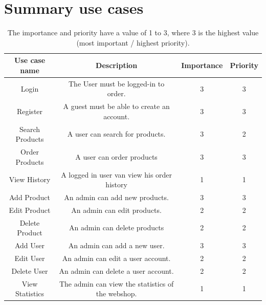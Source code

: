 \documentclass[titlepage, a4paper, 12pt]{article}
\begin{document}
\section{Summary use cases}
\begin{table}[ht]
	\centering
	\captionsetup{labelformat=empty}
	\begin{tabular}{|c|c|c|c|}
		\hline
		Use case name & Description & Importance & Priority\\
		\hline\hline
		Login & The User must be logged-in to order. & 3 & 3\\
		\hline
		Register & A guest must be able to create an account. & 3 & 3\\
		\hline
		Search Products & A user can search for products. & 3 & 2\\
		\hline
		Order Products & A user can order products & 3 & 3\\
		\hline
		View History & A logged in user van view his order history & 1 & 1\\
		\hline
		Add Product & An admin can add new products. & 3 & 3\\
		\hline
		Edit Product & An admin can edit products. & 2 & 2\\
		\hline
		Delete Product & An admin can delete products & 2 & 2\\
		\hline
		Add User & An admin can add a new user. & 3 & 3\\
		\hline
		Edit User & An admin can edit a user account. & 2 & 2\\
		\hline
		Delete User & An admin can delete a user account. & 2 & 2\\
		\hline
		View Statistics & The admin can view the statistics of the webshop. & 1 & 1\\
	\hline\end{tabular}
	\caption{The importance and priority have a value of 1 to 3, where 3 is the highest value (most important / highest priority).}
\end{table}

\newpage
\end{document}
